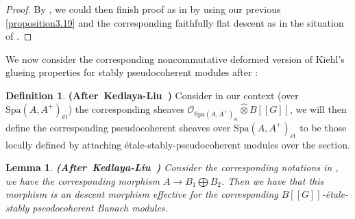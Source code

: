 \documentclass[12pt]{amsart}
\newtheorem{lemma}[theorem]{Lemma}
\theoremstyle{definition}
\newtheorem{definition}[theorem]{Definition}
\numberwithin{equation}{section}
\begin{document}
\begin{proof}
By \cite[Proposition 8.2.21]{KL1}, we could then finish proof as in \cite[Theorem 2.5.11]{KL2} by using our previous \cref{proposition3.19} and the corresponding faithfully flat descent as in the situation of \cite[Theorem 2.5.11]{KL2}.	
\end{proof}


\indent We now consider the corresponding noncommutative deformed version of Kiehl's glueing properties for stably pseudocoherent modules after \cite{KL2}:



\begin{definition} \mbox{\bf{(After Kedlaya-Liu \cite[Definition 2.5.12]{KL2})}}
Consider in our context (over $\mathrm{Spa}(A,A^+)_{\text{\'et}}$) the corresponding sheaves $\mathcal{O}_{\mathrm{Spa}(A,A^+)_{\text{\'et}}}\widehat{\otimes}B[[G]]$, we will then define the corresponding pseudocoherent sheaves over $\mathrm{Spa}(A,A^+)_{\text{\'et}}$ to be those locally defined by attaching \'etale-stably-pseudocoherent modules over the section. 
\end{definition}



\begin{lemma} \mbox{\bf{(After Kedlaya-Liu \cite[Lemma 2.5.13]{KL2})}}
	Consider the corresponding notations in \cite[Lemma 2.4.10]{KL2}, we have the corresponding morphism $A\rightarrow B_1\bigoplus B_2$. Then we have that this morphism is an descent morphism effective for the corresponding $B[[G]]$-\'etale-stably pseodocoherent Banach modules. 
\end{lemma}
\end{document}
